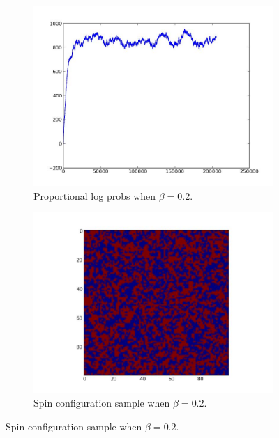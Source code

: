 \begin{figure}
\begin{subfigure}[b]{.49\textwidth}
		\includegraphics[width=\textwidth]{beta02_logprobs.jpeg}
		\caption{Proportional log probs when $\beta = 0.2$.}
		\label{figur:3}
	\end{subfigure}
	\begin{subfigure}[b]{.49\textwidth}
		\centering
		\includegraphics[width=\textwidth]{beta02_sample.jpeg}
		\caption{Spin configuration sample when $\beta = 0.2$.}
		\label{figur:4}
	\end{subfigure}
\end{figure}